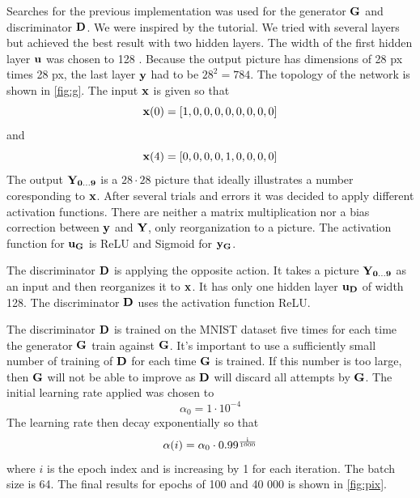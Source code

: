 \documentclass[../main.tex]{subfiles}
\begin{document}
Searches for the previous implementation was used for the generator $\mathbf{G}$ and discriminator $\mathbf{D}$. We were inspired by the tutorial. We tried with several layers but achieved the best result with two hidden layers. The width of the first hidden layer $\mathbf{u}$ was chosen to 128 \cite{tutorial-wgan}. Because the output picture has dimensions of 28 px times 28 px, the last layer $\mathbf{y}$ had to be $28^2=784$. The topology of the network  is shown in \autoref{fig:g}. The input $\mathbf{x}$ is given so that
\begin{equation}
    \mathbf{x}(0)=[1, 0, 0, 0, 0, 0, 0, 0, 0]
\end{equation}
and
\begin{equation}
    \mathbf{x}(4)=[0, 0, 0, 0, 1, 0, 0, 0, 0]
\end{equation}
The output $\mathbf{Y_{0...9}}$ is a $28\cdot28$  picture that ideally illustrates a number coresponding to $\mathbf{x}$. After several trials and errors it was decided to apply different activation functions. There are neither a matrix multiplication nor a bias correction between $\mathbf{y}$ and $\mathbf{Y}$, only reorganization to a picture. The activation function for $\mathbf{u_{G}}$ is ReLU and Sigmoid for $\mathbf{y_{G}}$.

The discriminator $\mathbf{D}$ is applying the opposite action. It takes a picture $\mathbf{Y_{0...9}}$ as an input and then reorganizes it to $\mathbf{x}$. It has only one hidden layer $\mathbf{u_{D}}$ of width 128. The discriminator $\mathbf{D}$ uses the activation function ReLU. 

The discriminator $\mathbf{D}$ is trained on the MNIST dataset five times for each time the generator $\mathbf{G}$ train against $\mathbf{G}$. It's important to use a sufficiently small number of training of $\mathbf{D}$ for each time $\mathbf{G}$ is trained. If this number is too large, then $\mathbf{G}$ will not be able to improve as $\mathbf{D}$ will discard all attempts by $\mathbf{G}$. The initial learning rate applied was chosen to
\begin{equation}
	\alpha_0 = 1 \cdot 10^{-4}
\end{equation}
The learning rate then decay exponentially so that
\begin{equation}
	\alpha(i)= \alpha_0 \cdot 0.99^{\frac{\rm i}{1000}}
\end{equation}
where $i$ is the epoch index and is increasing by 1 for each iteration. The batch size is 64. The final results for epochs of 100 and 40 000 is shown in \autoref{fig:pix}.
\end{document}
